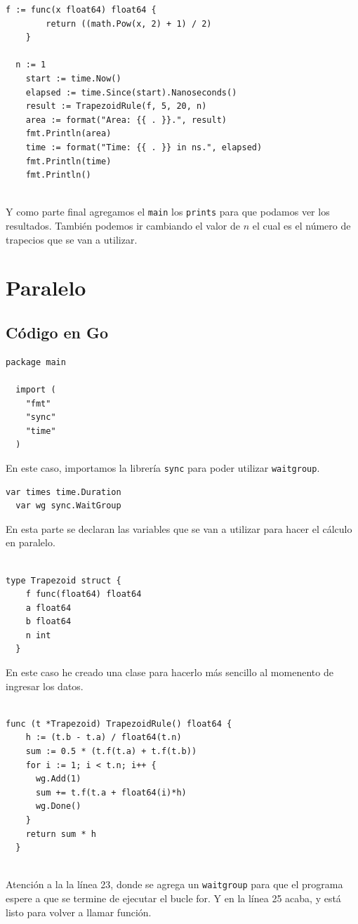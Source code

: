 \documentclass[a4paper]{article}
\begin{document}
\begin{lstlisting}[style=Golang, firstnumber=26]
  f := func(x float64) float64 {
		return ((math.Pow(x, 2) + 1) / 2)
	}

  n := 1
	start := time.Now()
	elapsed := time.Since(start).Nanoseconds()
	result := TrapezoidRule(f, 5, 20, n)
	area := format("Area: {{ . }}.", result)
	fmt.Println(area)
	time := format("Time: {{ . }} in ns.", elapsed)
	fmt.Println(time)
	fmt.Println()
  
\end{lstlisting}
Y como parte final agregamos el \texttt{main} los \texttt{prints} para que podamos ver los resultados.
También podemos ir cambiando el valor de $n$ el cual es el número de trapecios que se 
van a utilizar.


\section{Paralelo}
\subsection{Código en Go}

\begin{lstlisting}[style=Golang]
  package main

  import (
    "fmt"
    "sync"
    "time"
  )
\end{lstlisting}
En este caso, importamos la librería \texttt{sync} para poder utilizar 
\texttt{waitgroup}.

\begin{lstlisting}[style=Golang,firstnumber=9]
  var times time.Duration
  var wg sync.WaitGroup
\end{lstlisting}
En esta parte se declaran las variables que se van a utilizar para hacer
el cálculo en paralelo.\\
\\

\begin{lstlisting}[style=Golang,firstnumber=12]
  type Trapezoid struct {
    f func(float64) float64
    a float64
    b float64
    n int
  }

\end{lstlisting}
En este caso he creado una clase para hacerlo más sencillo al momenento de ingresar
los datos.\\
\\

\begin{lstlisting}[style=Golang,firstnumber=19]
  func (t *Trapezoid) TrapezoidRule() float64 {
    h := (t.b - t.a) / float64(t.n)
    sum := 0.5 * (t.f(t.a) + t.f(t.b))
    for i := 1; i < t.n; i++ {
      wg.Add(1)
      sum += t.f(t.a + float64(i)*h)
      wg.Done()
    }
    return sum * h
  }
  
\end{lstlisting}
Atención a la la línea 23, donde se agrega un \texttt{waitgroup} para que el programa
espere a que se termine de ejecutar el bucle for. Y en la línea 25 acaba, y está listo para
volver a llamar función. \nocite{tu2019understanding}
\end{document}
